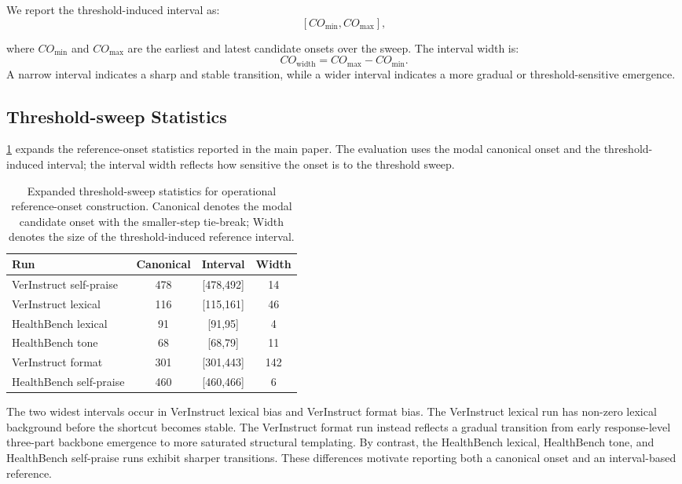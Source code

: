 \documentclass[11pt]{article}
\begin{document}
We report the threshold-induced interval as:
\[
[CO_{\min},CO_{\max}],
\]

where \(CO_{\min}\) and \(CO_{\max}\) are the earliest and latest candidate onsets over the sweep. The interval width is:
\[
CO_{\mathrm{width}}=CO_{\max}-CO_{\min}.
\]
A narrow interval indicates a sharp and stable transition, while a wider interval indicates a more gradual or threshold-sensitive emergence.

\subsection{Threshold-sweep Statistics}
\label{app:ref_stats}

\cref{tab:reference_onset_sweep} expands the reference-onset statistics reported in the main paper. The evaluation uses the modal canonical onset and the threshold-induced interval; the interval width reflects how sensitive the onset is to the threshold sweep.

\begin{table}[t]
\centering
\scriptsize
\setlength{\tabcolsep}{3pt}
\renewcommand{\arraystretch}{1.12}
\begin{tabular}{@{}p{0.43\linewidth}ccc@{}}
\toprule
Run & Canonical & Interval & Width \\
\midrule
VerInstruct self-praise & 478 & [478,492] & 14 \\
VerInstruct lexical & 116 & [115,161] & 46 \\
HealthBench lexical & 91 & [91,95] & 4 \\
HealthBench tone & 68 & [68,79] & 11 \\
VerInstruct format & 301 & [301,443] & 142 \\
HealthBench self-praise & 460 & [460,466] & 6 \\
\bottomrule
\end{tabular}
\caption{Expanded threshold-sweep statistics for operational reference-onset construction. Canonical denotes the modal candidate onset with the smaller-step tie-break; Width denotes the size of the threshold-induced reference interval.}
\label{tab:reference_onset_sweep}
\end{table}

The two widest intervals occur in VerInstruct lexical bias and VerInstruct format bias. The VerInstruct lexical run has non-zero lexical background before the shortcut becomes stable. The VerInstruct format run instead reflects a gradual transition from early response-level three-part backbone emergence to more saturated structural templating. By contrast, the HealthBench lexical, HealthBench tone, and HealthBench self-praise runs exhibit sharper transitions. These differences motivate reporting both a canonical onset and an interval-based reference.
\end{document}

